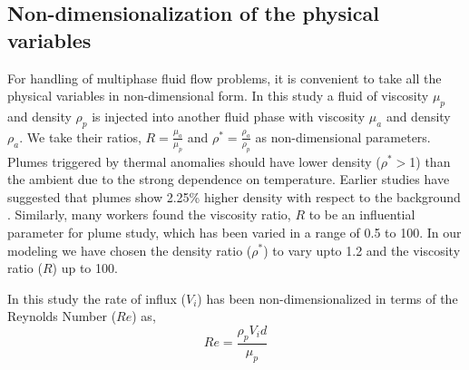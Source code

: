 \documentclass[12pt]{article}
\begin{document}
\subsection{Non-dimensionalization of the physical variables}
\label{sec:non_dim}

For handling of multiphase fluid flow problems, it is convenient to take all the physical variables in non-dimensional form. In this study a fluid of viscosity $\mu_p$ and density $\rho_p$ is injected into another fluid phase with viscosity $\mu_a$ and density $\rho_a$. We 
take their ratios, $R=\frac {\mu_a}{\mu_p}$ and $\rho^*=\frac {\rho_a}{\rho_p}$ as non-dimensional parameters. Plumes triggered by thermal anomalies should have lower density ($\rho^*>$1) than the ambient due to the strong dependence on temperature. Earlier studies have suggested that plumes show 2.25\% higher density with respect to the background \cite{tan2005metastable}. Similarly, many workers \cite{olson1985creeping, dutta2013ballooning, dutta2014ascent} found the viscosity ratio, $R$ to be an influential parameter for plume study, which has been varied in a range of 0.5 to 100. In our modeling we have chosen the density ratio ($\rho^*$) to vary upto 1.2 and the viscosity ratio ($R$) up to 100. 


In this study the rate of influx ($V_i$) has been non-dimensionalized in terms of the Reynolds Number 
($Re$) as, 
\begin{equation}
Re = \frac {\rho_p V_i d}{\mu_p}
\label{eqn:influx}
\end{equation}
\end{document}
